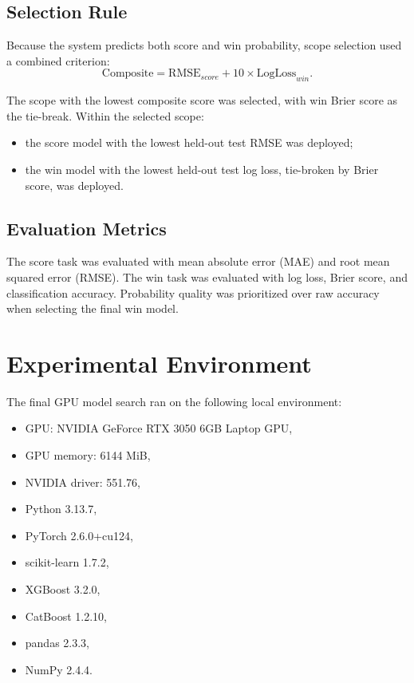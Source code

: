\documentclass[conference]{IEEEtran}
\begin{document}
\subsection{Selection Rule}
Because the system predicts both score and win probability, scope selection used a combined criterion:
\begin{equation}
\text{Composite} = \text{RMSE}_{score} + 10 \times \text{LogLoss}_{win}.
\end{equation}

The scope with the lowest composite score was selected, with win Brier score as the tie-break. Within the selected scope:
\begin{itemize}
\item the score model with the lowest held-out test RMSE was deployed;
\item the win model with the lowest held-out test log loss, tie-broken by Brier score, was deployed.
\end{itemize}

\subsection{Evaluation Metrics}
The score task was evaluated with mean absolute error (MAE) and root mean squared error (RMSE). The win task was evaluated with log loss, Brier score, and classification accuracy. Probability quality was prioritized over raw accuracy when selecting the final win model.

\section{Experimental Environment}
The final GPU model search ran on the following local environment:
\begin{itemize}
\item GPU: NVIDIA GeForce RTX 3050 6GB Laptop GPU,
\item GPU memory: 6144 MiB,
\item NVIDIA driver: 551.76,
\item Python 3.13.7,
\item PyTorch 2.6.0+cu124,
\item scikit-learn 1.7.2,
\item XGBoost 3.2.0,
\item CatBoost 1.2.10,
\item pandas 2.3.3,
\item NumPy 2.4.4.
\end{itemize}
\end{document}
